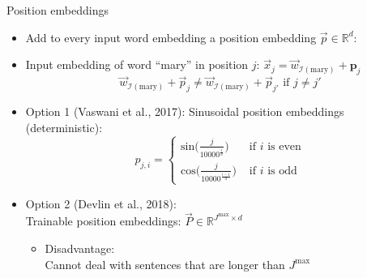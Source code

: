 \begin{vbframe}{Position embeddings}

\vfill

\begin{itemize}
\item Add to every input word embedding a position embedding $\vec {p} \in \mathbb{R}^d$:
\item Input embedding of word ``mary'' in position $j$: $\vec {x}_j = \vec {w}_{\mathcal{I}(\text{mary})} + \mathbf{p}_j$
$$\vec {w}_{\mathcal{I}(\text{mary})} + \vec {p}_j \neq \vec{w}_{\mathcal{I}(\text{mary})} + \vec {p}_{j'} \text{ if } j \neq j'$$
\item Option 1 (Vaswani et al., 2017): Sinusoidal position embeddings (deterministic): 
$$p_{j,i} = \begin{cases} \mathrm{sin}\big(\frac{j}{10000^\frac{i}{d}}\big)  & \text{ if } i \text{ is even} \\ \mathrm{cos}\big(\frac{j}{10000^\frac{i-1}{d}}\big) & \text{ if } i \text{ is odd}  \end{cases}$$
\item Option 2 (Devlin et al., 2018):\\Trainable position embeddings: $\vec {P} \in \mathbb{R}^{J^\mathrm{max} \times d}$
\begin{itemize}
\item Disadvantage:\\Cannot deal with sentences that are longer than $J^\mathrm{max}$
\end{itemize}
\end{itemize}

\vfill

\end{vbframe}


\endlecture

